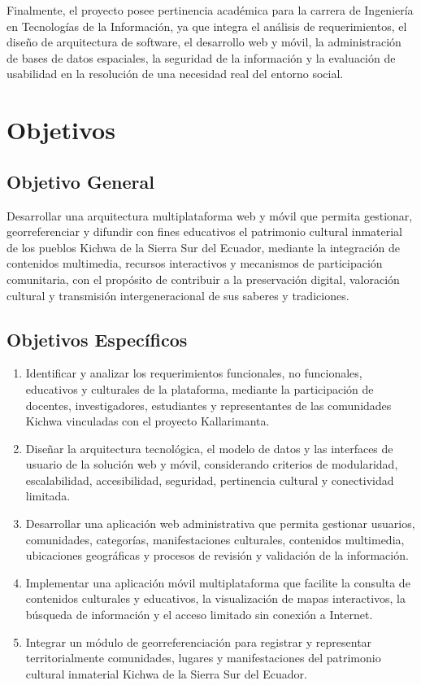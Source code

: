 Finalmente, el proyecto posee pertinencia académica para la carrera de Ingeniería en Tecnologías de la Información, ya que integra el análisis de requerimientos, el diseño de arquitectura de software, el desarrollo web y móvil, la administración de bases de datos espaciales, la seguridad de la información y la evaluación de usabilidad en la resolución de una necesidad real del entorno social.

\section{Objetivos}
\subsection{Objetivo General}
Desarrollar una arquitectura multiplataforma web y móvil que permita gestionar, georreferenciar y difundir con fines educativos el patrimonio cultural inmaterial de los pueblos Kichwa de la Sierra Sur del Ecuador, mediante la integración de contenidos multimedia, recursos interactivos y mecanismos de participación comunitaria, con el propósito de contribuir a la preservación digital, valoración cultural y transmisión intergeneracional de sus saberes y tradiciones.

\subsection{Objetivos Específicos}
\begin{enumerate}
  \item Identificar y analizar los requerimientos funcionales, no funcionales, educativos y culturales de la plataforma, mediante la participación de docentes, investigadores, estudiantes y representantes de las comunidades Kichwa vinculadas con el proyecto Kallarimanta.
  \item Diseñar la arquitectura tecnológica, el modelo de datos y las interfaces de usuario de la solución web y móvil, considerando criterios de modularidad, escalabilidad, accesibilidad, seguridad, pertinencia cultural y conectividad limitada.
  \item Desarrollar una aplicación web administrativa que permita gestionar usuarios, comunidades, categorías, manifestaciones culturales, contenidos multimedia, ubicaciones geográficas y procesos de revisión y validación de la información.
  \item Implementar una aplicación móvil multiplataforma que facilite la consulta de contenidos culturales y educativos, la visualización de mapas interactivos, la búsqueda de información y el acceso limitado sin conexión a Internet.
  \item Integrar un módulo de georreferenciación para registrar y representar territorialmente comunidades, lugares y manifestaciones del patrimonio cultural inmaterial Kichwa de la Sierra Sur del Ecuador.
\end{enumerate}

